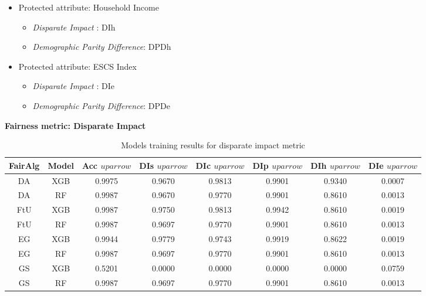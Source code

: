 \begin{itemize}
\begin{itemize}
        \item Protected attribute: Household Income
        \begin{itemize}
            \item \emph{Disparate Impact }: DIh
            \item \emph{Demographic Parity Difference}: DPDh
        \end{itemize}
        \item Protected attribute: ESCS Index
        \begin{itemize}
            \item \emph{Disparate Impact }: DIe
            \item \emph{Demographic Parity Difference}: DPDe
        \end{itemize}
    \end{itemize}
\end{itemize}

\textbf{Fairness metric: Disparate Impact}

\begin{table}
    \centering
    \begin{tabular}{|c|c|c|c|c|c|c|c|}
        \hline
        \textbf{FairAlg} & \textbf{Model} & \textbf{Acc} $uparrow$ & \textbf{DIs} $uparrow$ & \textbf{DIc} $uparrow$ & \textbf{DIp} $uparrow$ & \textbf{DIh} $uparrow$ & \textbf{DIe} $uparrow$ \\
        \hline
        DA & XGB & 0.9975 & 0.9670 & 0.9813 & 0.9901 & 0.9340 & 0.0007 \\
        \hline
        DA & RF & 0.9987 & 0.9670 & 0.9770 & 0.9901 & 0.8610 & 0.0013 \\
        \hline
        FtU & XGB & 0.9987 & 0.9750 & 0.9813 & 0.9942 & 0.8610 & 0.0019 \\
        \hline
        FtU & RF & 0.9987 & 0.9697 & 0.9770 & 0.9901 & 0.8610 & 0.0013 \\
        \hline
        EG & XGB & 0.9944 & 0.9779 & 0.9743 & 0.9919 & 0.8622 & 0.0019 \\
        \hline
        EG & RF & 0.9987 & 0.9697 & 0.9770 & 0.9901 & 0.8610 & 0.0013 \\
        \hline
        GS & XGB & 0.5201 & 0.0000 & 0.0000 & 0.0000 & 0.0000 & 0.0759 \\
        \hline
        GS & RF & 0.9987 & 0.9697 & 0.9770 & 0.9901 & 0.8610 & 0.0013 \\
        \hline
    \end{tabular}
    \caption{Models training results for disparate impact metric}
    \label{tab:results_di}
\end{table}

